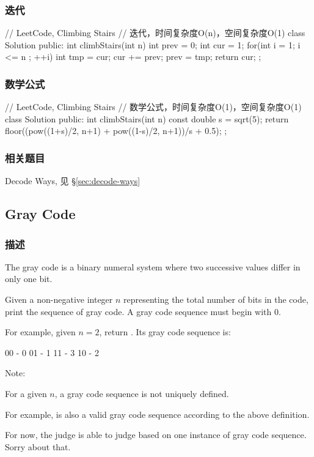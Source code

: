 \subsubsection{迭代}
\begin{Code}
// LeetCode, Climbing Stairs
// 迭代，时间复杂度O(n)，空间复杂度O(1)
class Solution {
public:
    int climbStairs(int n) {
        int prev = 0;
        int cur = 1;
        for(int i = 1; i <= n ; ++i){
            int tmp = cur;
            cur += prev;
            prev = tmp;
        }
        return cur;
    }
};
\end{Code}


\subsubsection{数学公式}
\begin{Code}
// LeetCode, Climbing Stairs
// 数学公式，时间复杂度O(1)，空间复杂度O(1)
class Solution {
    public:
    int climbStairs(int n) {
        const double s = sqrt(5);
        return floor((pow((1+s)/2, n+1) + pow((1-s)/2, n+1))/s + 0.5);
    }
};
\end{Code}


\subsubsection{相关题目}
\begindot
\item Decode Ways, 见 \S \ref{sec:decode-ways}
\myenddot


\subsection{Gray Code} %
\label{sec:gray-code}


\subsubsection{描述}
The gray code is a binary numeral system where two successive values differ in only one bit.

Given a non-negative integer $n$ representing the total number of bits in the code, print the sequence of gray code. A gray code sequence must begin with 0.

For example, given $n = 2$, return \fn{[0,1,3,2]}. Its gray code sequence is:
\begin{Code}
00 - 0
01 - 1
11 - 3
10 - 2
\end{Code}

Note:
\begindot
\item For a given $n$, a gray code sequence is not uniquely defined.
\item For example, \fn{[0,2,3,1]} is also a valid gray code sequence according to the above definition.
\item For now, the judge is able to judge based on one instance of gray code sequence. Sorry about that.
\myenddot


